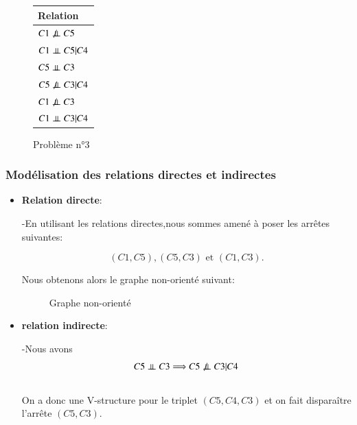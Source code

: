 \documentclass[a4paper]{article}
\begin{document}
\begin{appendices}
 \begin{figure}[H]
\begin{center}
\begin{tabular}{|l|}
  \hline
  Relation  \\
  \hline
$C1\not \perp\!\!\!\perp C5$\\
$C1 \perp\!\!\!\perp C5 | C4$ \\
$C5 \perp\!\!\!\perp C3$\\
$C5 \not\perp\!\!\!\perp C3 |C4$\\
$C1 \not\perp\!\!\!\perp C3$\\
$C1 \perp\!\!\!\perp C3 |C4$\\
\hline
\end{tabular}
\end{center}
\caption{Problème n°3}
\end{figure}

\subsubsection{Modélisation des relations directes et indirectes}

\begin{itemize}

\item \textbf{Relation directe}:

-En utilisant les relations directes,nous sommes amené à poser les arrêtes suivantes:

$$(C1,C5),(C5,C3) \text{  et  } (C1,C3).$$

Nous obtenons alors le graphe non-orienté suivant:

\begin{figure}[H] 
    \center 
    \caption{Graphe non-orienté} 
\end{figure} 

\item \textbf{relation indirecte}:

-Nous avons $$C5 \perp\!\!\!\perp C3 \Longrightarrow   C5 \not\perp\!\!\!\perp C3|C4 $${\\}
On a donc une V-structure pour le triplet $(C5,C4,C3)$ et on fait disparaître l'arrête $(C5,C3)$.


\end{itemize}
\end{appendices}
\end{document}
